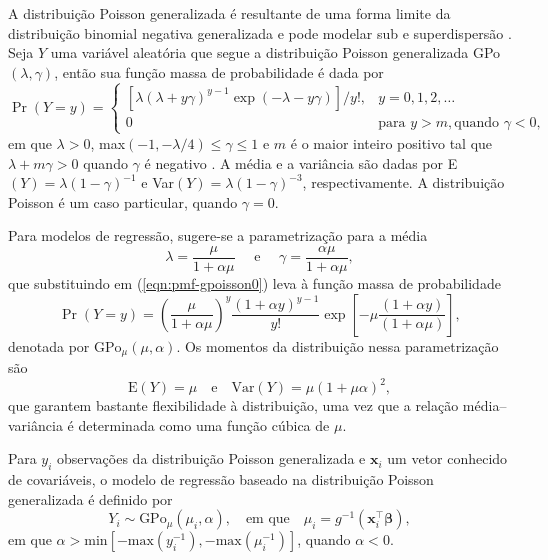 \documentclass[
    oldfontcommands,
    11pt,
    openright,
    twoside,
    a4paper,
    english,
    brazil
]{abntex2}\usepackage[]{graphicx}\usepackage[]{color}
\begin{document}
A distribuição Poisson generalizada é resultante de uma forma limite da
distribuição binomial negativa generalizada e pode modelar sub e
superdispersão \citep{Zamani2012}. Seja $Y$ uma variável aleatória que
segue a distribuição Poisson generalizada GPo$(\lambda, \gamma)$, então
sua função massa de probabilidade é dada por
\begin{equation}
  \label{eqn:pmf-gpoisson0}
  \Pr(Y=y) =
  \begin{cases}
    \left [ \lambda (\lambda + y\gamma)^{y-1}
      \exp(-\lambda - y\gamma) \right ] / y!, & y =0, 1,2,\ldots \\
    0 & \text{para } y > m, \text{quando } \gamma < 0,
  \end{cases}
\end{equation}
em que $\lambda>0$, max$(-1, -\lambda/4) \leq \gamma \leq 1$ e $m$ é o
maior inteiro positivo tal que $\lambda + m\gamma >0$ quando $\gamma$ é
negativo \citep{Consul1992}. A média e a variância são dadas por
E$(Y) = \lambda(1-\gamma)^{-1}$ e Var$(Y) = \lambda(1-\gamma)^{-3}$,
respectivamente. A distribuição Poisson é um caso particular, quando
$\gamma=0$.

Para modelos de regressão, sugere-se a parametrização para a média
$$
\lambda = \frac{\mu}{1 + \alpha \mu} \quad \text{ e } \quad
\gamma = \frac{\alpha \mu}{ 1 + \alpha \mu},
$$
que substituindo em (\ref{eqn:pmf-gpoisson0}) leva à função massa de
probabilidade
\begin{equation}
  \label{eqn:pmf-gpoisson}
  \Pr(Y=y) = \left ( \frac{\mu}{1+\alpha \mu} \right )^y
    \frac{(1+\alpha y)^{y-1}}{y!}
    \exp \left [ - \mu \frac{(1 + \alpha y)}{( 1 + \alpha \mu)}
    \right ],
\end{equation}
denotada por $\text{GPo}_\mu(\mu, \alpha)$. Os momentos da distribuição
nessa parametrização são
\begin{equation}
  \label{eqn:moments-gpo}
\text{E}(Y) = \mu \quad \text{e} \quad
   \text{Var}(Y) = \mu (1 + \mu\alpha)^2,
\end{equation}
que garantem bastante flexibilidade à distribuição, uma vez que a
relação média--variância é determinada como uma função cúbica de $\mu$.

Para $y_i$ observações da distribuição Poisson generalizada e $\bm{x}_i$
um vetor conhecido de covariáveis, o modelo de regressão baseado na
distribuição Poisson generalizada é definido por
$$
Y_i \sim \text{GPo}_\mu(\mu_i, \alpha), \quad \text{em que} \quad
  \mu_i = g^{-1}(\bm{x}_i^\top\bm{\beta}),
$$
em que
$\alpha > \text{min}[ -\text{max}(y_i^{-1}), -\text{max}(\mu_i^{-1})]$,
quando $\alpha<0$.
\end{document}
